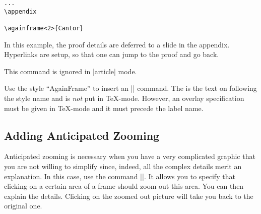 \begin{command}{\againframe{}}
\begin{verbatim}
...
\appendix

\againframe<2>{Cantor}
\end{verbatim}

  In this example, the proof details are deferred to a slide in the appendix. Hyperlinks are setup, so that one can jump to the proof and go back.

  \articlenote
  This command is ignored in |article| mode.

  \lyxnote
  Use the style ``AgainFrame'' to insert an |\againframe| command. The  is the text on following the style name and is \emph{not} put in \TeX-mode. However, an overlay specification must be given in \TeX-mode and it must precede the label name.
\end{command}


\subsection{Adding Anticipated Zooming}
\label{section-zooming}

Anticipated zooming is necessary when you have a very complicated graphic that you are not willing to simplify since, indeed, all the complex details merit an explanation. In this case, use the command |\framezoom|. It allows you to specify that clicking on a certain area of a frame should zoom out this area. You can then explain the details. Clicking on the zoomed out picture will take you back to the original one.

